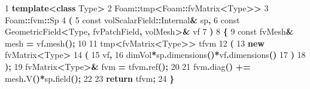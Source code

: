 \documentclass[
]{book}
\newenvironment{Shaded}{\begin{snugshade}}{\end{snugshade}}
\newcommand{\AttributeTok}[1]{\textcolor[rgb]{0.77,0.63,0.00}{#1}}
\newcommand{\ControlFlowTok}[1]{\textcolor[rgb]{0.13,0.29,0.53}{\textbf{#1}}}
\newcommand{\DecValTok}[1]{\textcolor[rgb]{0.00,0.00,0.81}{#1}}
\newcommand{\KeywordTok}[1]{\textcolor[rgb]{0.13,0.29,0.53}{\textbf{#1}}}
\newcommand{\NormalTok}[1]{#1}
\newcommand{\OperatorTok}[1]{\textcolor[rgb]{0.81,0.36,0.00}{\textbf{#1}}}
\begin{document}
\begin{Shaded}
\begin{Highlighting}[]
\DecValTok{1}   \KeywordTok{template}\OperatorTok{\textless{}}\KeywordTok{class}\NormalTok{ Type}\OperatorTok{\textgreater{}}
\DecValTok{2}\NormalTok{   Foam}\OperatorTok{::}\NormalTok{tmp}\OperatorTok{\textless{}}\NormalTok{Foam}\OperatorTok{::}\NormalTok{fvMatrix}\OperatorTok{\textless{}}\NormalTok{Type}\OperatorTok{\textgreater{}\textgreater{}}
\DecValTok{3}\NormalTok{   Foam}\OperatorTok{::}\NormalTok{fvm}\OperatorTok{::}\NormalTok{Sp}
\DecValTok{4}   \OperatorTok{(}
\DecValTok{5}       \AttributeTok{const}\NormalTok{ volScalarField}\OperatorTok{::}\NormalTok{Internal}\OperatorTok{\&}\NormalTok{ sp}\OperatorTok{,}
\DecValTok{6}       \AttributeTok{const}\NormalTok{ GeometricField}\OperatorTok{\textless{}}\NormalTok{Type}\OperatorTok{,}\NormalTok{ fvPatchField}\OperatorTok{,}\NormalTok{ volMesh}\OperatorTok{\textgreater{}\&}\NormalTok{ vf}
\DecValTok{7}   \OperatorTok{)}
\DecValTok{8}   \OperatorTok{\{}
\DecValTok{9}       \AttributeTok{const}\NormalTok{ fvMesh}\OperatorTok{\&}\NormalTok{ mesh }\OperatorTok{=}\NormalTok{ vf}\OperatorTok{.}\NormalTok{mesh}\OperatorTok{();}
\DecValTok{10}  
\DecValTok{11}\NormalTok{      tmp}\OperatorTok{\textless{}}\NormalTok{fvMatrix}\OperatorTok{\textless{}}\NormalTok{Type}\OperatorTok{\textgreater{}\textgreater{}}\NormalTok{ tfvm}
\DecValTok{12}      \OperatorTok{(}
\DecValTok{13}          \KeywordTok{new}\NormalTok{ fvMatrix}\OperatorTok{\textless{}}\NormalTok{Type}\OperatorTok{\textgreater{}}
\DecValTok{14}          \OperatorTok{(}
\DecValTok{15}\NormalTok{              vf}\OperatorTok{,}
\DecValTok{16}\NormalTok{              dimVol}\OperatorTok{*}\NormalTok{sp}\OperatorTok{.}\NormalTok{dimensions}\OperatorTok{()*}\NormalTok{vf}\OperatorTok{.}\NormalTok{dimensions}\OperatorTok{()}
\DecValTok{17}          \OperatorTok{)}
\DecValTok{18}      \OperatorTok{);}
\DecValTok{19}\NormalTok{      fvMatrix}\OperatorTok{\textless{}}\NormalTok{Type}\OperatorTok{\textgreater{}\&}\NormalTok{ fvm }\OperatorTok{=}\NormalTok{ tfvm}\OperatorTok{.}\NormalTok{ref}\OperatorTok{();}
\DecValTok{20}  
\DecValTok{21}\NormalTok{      fvm}\OperatorTok{.}\NormalTok{diag}\OperatorTok{()} \OperatorTok{+=}\NormalTok{ mesh}\OperatorTok{.}\NormalTok{V}\OperatorTok{()*}\NormalTok{sp}\OperatorTok{.}\NormalTok{field}\OperatorTok{();}
\DecValTok{22}  
\DecValTok{23}      \ControlFlowTok{return}\NormalTok{ tfvm}\OperatorTok{;}
\DecValTok{24}  \OperatorTok{\}}
\end{Highlighting}
\end{Shaded}
\end{document}
